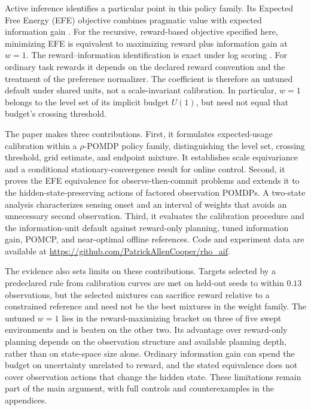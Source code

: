 Active inference identifies a particular point in this policy family. Its Expected Free Energy (EFE) objective combines pragmatic value with expected information gain \citep{friston2010,parr2019}. For the recursive, reward-based objective specified here, minimizing EFE is equivalent to maximizing reward plus information gain at $w=1$. The reward--information identification is exact under log scoring \citep{bernardo1979}. For ordinary task rewards it depends on the declared reward convention and the treatment of the preference normalizer. The coefficient is therefore an untuned default under shared units, not a scale-invariant calibration. In particular, $w=1$ belongs to the level set of its implicit budget $U(1)$, but need not equal that budget's crossing threshold.

The paper makes three contributions. First, it formulates expected-usage calibration within a $\rho$-POMDP policy family, distinguishing the level set, crossing threshold, grid estimate, and endpoint mixture. It establishes scale equivariance and a conditional stationary-convergence result for online control. Second, it proves the EFE equivalence for observe-then-commit problems and extends it to the hidden-state-preserving actions of factored observation POMDPs. A two-state analysis characterizes sensing onset and an interval of weights that avoids an unnecessary second observation. Third, it evaluates the calibration procedure and the information-unit default against reward-only planning, tuned information gain, POMCP, and near-optimal offline references. Code and experiment data are available at \url{https://github.com/PatrickAllenCooper/rho_aif}.

The evidence also sets limits on these contributions. Targets selected by a predeclared rule from calibration curves are met on held-out seeds to within $0.13$ observations, but the selected mixtures can sacrifice reward relative to a constrained reference and need not be the best mixtures in the weight family. The untuned $w=1$ lies in the reward-maximizing bracket on three of five swept environments and is beaten on the other two. Its advantage over reward-only planning depends on the observation structure and available planning depth, rather than on state-space size alone. Ordinary information gain can spend the budget on uncertainty unrelated to reward, and the stated equivalence does not cover observation actions that change the hidden state. These limitations remain part of the main argument, with full controls and counterexamples in the appendices.

